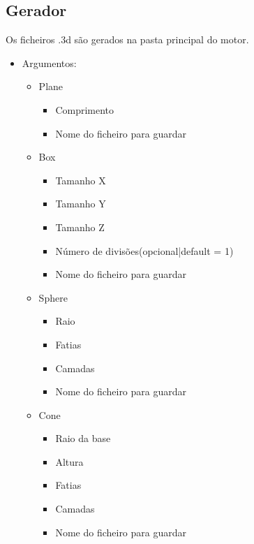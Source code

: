 \documentclass{report}
\begin{document}
\subsection{Gerador}
Os ficheiros .3d são gerados na pasta principal do motor.
\begin{itemize}
\item Argumentos:
\begin{itemize}
    \item Plane
        \begin{itemize}
            \item Comprimento
            \item Nome do ficheiro para guardar
        \end{itemize}
    \item Box
        \begin{itemize}
            \item Tamanho X
            \item Tamanho Y
            \item Tamanho Z
            \item N\'umero de divis\~oes(opcional|default = 1)
            \item Nome do ficheiro para guardar
        \end{itemize}
    \item Sphere
        \begin{itemize}
            \item Raio
            \item Fatias
            \item Camadas
            \item Nome do ficheiro para guardar
        \end{itemize}
    \item Cone
        \begin{itemize}
            \item Raio da base
            \item Altura
            \item Fatias
            \item Camadas
            \item Nome do ficheiro para guardar
        \end{itemize}
\end{itemize}

\end{itemize}
\clearpage
\end{document}
